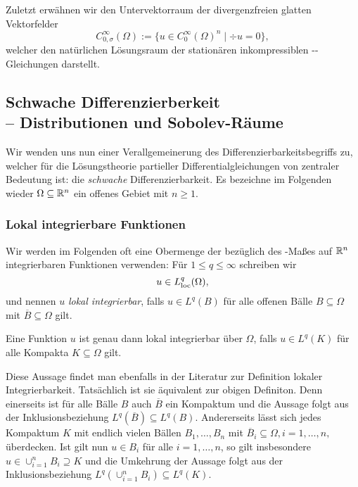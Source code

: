 Zuletzt erwähnen wir den Untervektorraum der divergenzfreien glatten Vektorfelder
$$
C_{0,\sigma}^\infty(\Omega) := \{u \in C_0^\infty(\Omega)^n \mid \div u = 0\},
$$
 welcher den natürlichen Lösungsraum der stationären inkompressiblen \navier\hyp{}\stokes\hyp{}Gleichungen darstellt.

\subsection{Schwache Differenzierberkeit \\-- Distributionen und Sobolev-Räume}
\label{subsec:distributionsSobolev}

Wir wenden uns nun einer Verallgemeinerung des Differenzierbarkeitsbegriffs zu, welcher für die Lösungstheorie partieller Differentialgleichungen von zentraler Bedeutung ist: die \emph{schwache} Differenzierbarkeit.
Es bezeichne im Folgenden wieder $\Omega \subseteq \mathbb{R}^n$ ein offenes Gebiet mit $n \geq 1$.

\subsubsection{Lokal integrierbare Funktionen}

Wir werden im Folgenden oft eine Obermenge der bezüglich des \lebesgue\hyp{}Maßes auf $\mathbb{R}^n$ integrierbaren Funktionen verwenden:
Für $1 \leq q \leq \infty$ schreiben wir
$$
  u \in L^q_{\operatorname{loc}}(\Omega),
$$
und nennen $u$ \emph{lokal integrierbar}, falls $u \in L^q(B)$ für alle offenen Bälle $B \subseteq \Omega$ mit $\overline B \subseteq \Omega$ gilt.

\begin{bem}
  Eine Funktion $u$ ist genau dann lokal integrierbar über $\Omega$, falls $u \in L^q(K)$ für alle Kompakta $K \subseteq \Omega$ gilt.

  Diese Aussage findet man ebenfalls in der Literatur zur Definition lokaler Integrierbarkeit.
  Tatsächlich ist sie äquivalent zur obigen Definiton.
  Denn einerseits ist für alle Bälle $B$ auch $\overline B$ ein Kompaktum und die Aussage folgt aus der Inklusionsbeziehung $L^q(\overline B) \subseteq L^q(B)$.
  Andererseits lässt sich jedes Kompaktum $K$ mit endlich vielen Bällen $B_1, \dots, B_n$ mit $\overline B_i \subseteq \Omega, i =1,\dots,n,$ überdecken. 
  Ist gilt nun $u \in B_i$ für alle $i = 1, \dots, n$, so gilt insbesondere $u \in \cup_{i = 1}^n B_i \supseteq K$ und die Umkehrung der Aussage folgt aus der Inklusionsbeziehung $L^q(\cup_{i = 1}^n B_i) \subseteq L^q(K)$.
\end{bem}

